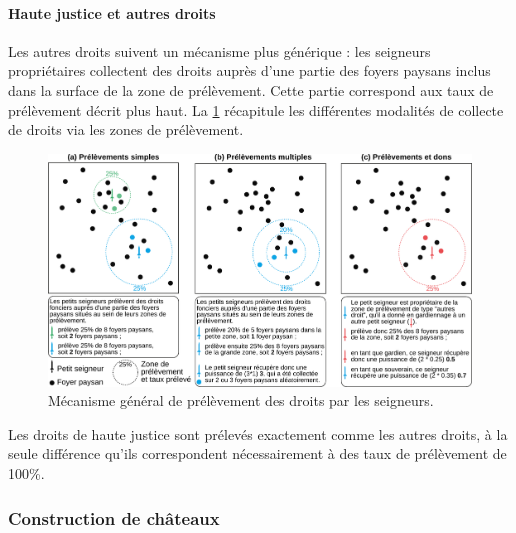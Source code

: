 \paragraph{Haute justice et autres droits}

Les autres droits suivent un mécanisme plus générique : les seigneurs propriétaires collectent des droits auprès d'une partie des foyers paysans inclus dans la surface de la zone de prélèvement.
Cette partie correspond aux \og taux de prélèvement\fg{} décrit plus haut. La \cref{fig:prelevement-droits} récapitule les différentes modalités de collecte de droits via les zones de prélèvement.

\begin{figure}[H]
	\centering
	\includegraphics[width=\linewidth]{img/prelevements_droits.pdf}
	\caption{Mécanisme général de prélèvement des droits par les seigneurs.}
	\label{fig:prelevement-droits}
\end{figure}

Les droits de haute justice sont prélevés exactement comme les autres droits, à la seule différence qu'ils correspondent nécessairement à des taux de prélèvement de 100\%.

\subsubsection{Construction de châteaux \label{sssec:constru-chateaux}}


